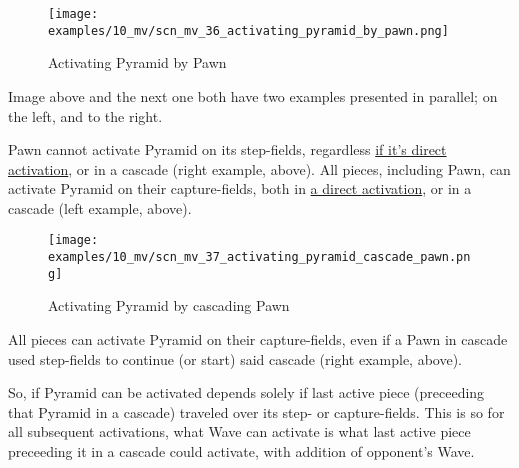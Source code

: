 \vspace*{-1.4\baselineskip}
\noindent
\begin{figure}[!h]
\texttt{[image: examples/10\_mv/scn\_mv\_36\_activating\_pyramid\_by\_pawn.png]}
\vspace*{-1.3\baselineskip}
\caption{Activating Pyramid by Pawn}
\label{fig:scn_mv_36_activating_pyramid_by_pawn}
\end{figure}

\vspace*{-0.3\baselineskip}
Image above and the next one both have two examples presented in parallel; on the left,
and to the right.

Pawn cannot activate Pyramid on its step-fields, regardless
\hyperref[fig:scn_ma_04_pyramid_activation_by_pawn]{if it's direct activation}, or in a cascade
(right example, above). All pieces, including Pawn, can activate Pyramid on their capture-fields,
both in \hyperref[fig:scn_ma_01_pyramid_activation_init]{a direct activation}, or in a cascade
(left example, above).

\clearpage %

\vspace*{-2.5\baselineskip}
\noindent
\begin{figure}[!h]
\texttt{[image: examples/10\_mv/scn\_mv\_37\_activating\_pyramid\_cascade\_pawn.png]}
\vspace*{-1.5\baselineskip}
\caption{Activating Pyramid by cascading Pawn}
\label{fig:scn_mv_37_activating_pyramid_cascade_pawn}
\end{figure}

\vspace*{-0.5\baselineskip}
All pieces can activate Pyramid on their capture-fields, even if a Pawn in cascade
used step-fields to continue (or start) said cascade (right example, above).

So, if Pyramid can be activated depends solely if last active piece (preceeding that
Pyramid in a cascade) traveled over its step- or capture-fields. This is so for all
subsequent activations, what Wave can activate is what last active piece preceeding
it in a cascade could activate, with addition of opponent's Wave.

\clearpage %

